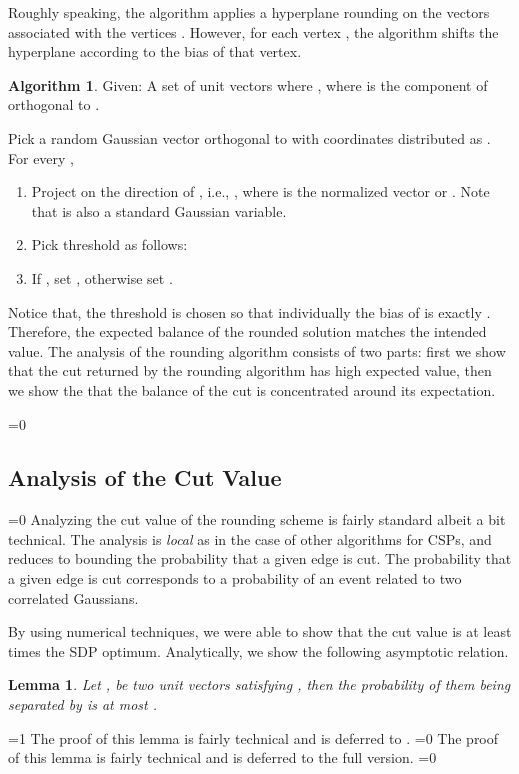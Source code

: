 \documentclass[11pt]{article}
\def\full{1}
\newtheorem{lemma}[theorem]{Lemma}
\theoremstyle{definition}
\newtheorem{algorithm}[theorem]{Algorithm}
\newenvironment{mybox}
{\center \noindent\begin{boxedminipage}{1.0\linewidth}}
{\end{boxedminipage}
\noindent
}
\newcommand{\ie}{i.e.,\xspace}
\numberwithin{equation}{section}
\let\pref=\prettyref
\begin{document}
Roughly speaking, the algorithm applies a hyperplane rounding on
the vectors  associated with the vertices
.  However, for each vertex , the algorithm shifts
the hyperplane according to the bias of that vertex.

\begin{mybox}
\begin{algorithm} \label{alg:rounding}
Given: A set of unit vectors  where , where  is the component of  orthogonal to .

Pick a random Gaussian vector  orthogonal to  with coordinates distributed as .
For every ,
\begin{enumerate}
\item
Project  on the direction of , \ie
,
where  is the normalized vector or . Note that  is also a standard Gaussian variable.
\item
Pick threshold  as follows:


\item
If , set , otherwise set .
\end{enumerate}
\end{algorithm}
\end{mybox}

Notice that, the threshold  is chosen so that individually the bias of  is exactly . Therefore, the expected balance of the rounded solution matches the intended value.
The analysis of the rounding algorithm consists of two parts: first we
show that the cut returned by the rounding algorithm has high expected
value, then we show the that the balance of the cut is concentrated
around its expectation.

\ifnum\full=0 \vspace{-8pt}\fi
\subsection{Analysis of the Cut Value}
\ifnum\full=0 \vspace{-8pt}\fi
Analyzing the cut value of the rounding scheme is fairly standard
albeit a bit technical.  The analysis is {\it local} as in the case of
other algorithms for CSPs, and reduces to bounding the probability
that a given edge is cut.  The probability that a given edge  is
cut corresponds to a probability of an event related to two correlated
Gaussians.

By using numerical techniques, we were able to show that the
cut value is at least  times the SDP optimum.  Analytically, we
show the following asymptotic relation.
\begin{lemma} \label{lem:rooteps}
Let , be two unit vectors satisfying , then the probability of them being separated by \pref{alg:rounding} is at most .
\end{lemma}
\ifnum\full=1
The proof of this lemma is fairly technical and is deferred to \pref{app:cutvalue}.
\fi
\ifnum\full=0
The proof of this lemma is fairly technical and is deferred to the
full version.
\fi
\ifnum\full=0 \vspace{-8pt}\fi
\end{document}
